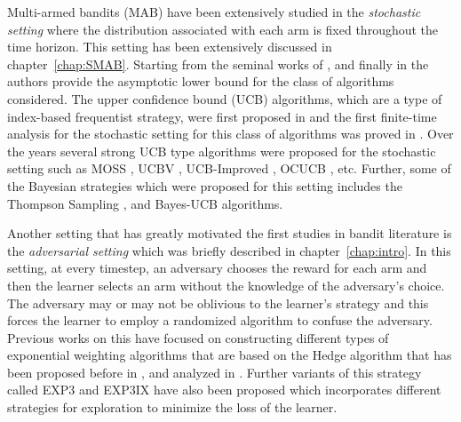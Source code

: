 Multi-armed bandits (MAB) have been extensively studied in the \textit{stochastic setting} where the distribution associated with each arm is fixed throughout the time horizon. This setting has been extensively discussed in chapter~\ref{chap:SMAB}. Starting from the seminal works of \citet{thompson1933likelihood}, \citet{robbins1952some} and finally in \citet{lai1985asymptotically} the authors provide the asymptotic lower bound for the class of algorithms considered.  The upper confidence bound (UCB) algorithms, which are a type of index-based frequentist strategy, were first proposed in \citet{agrawal1995sample} and the first finite-time analysis for the stochastic setting for this class of algorithms was proved in \citet{auer2002finite}. Over the years several strong UCB type algorithms were proposed for the stochastic setting such as MOSS \citep{audibert2009minimax}, UCBV \citep{audibert2009exploration}, UCB-Improved \citep{auer2010ucb}, OCUCB \citep{lattimore2015optimally}, etc. Further, some of the Bayesian strategies which were proposed for this setting includes the Thompson Sampling \citep{agrawal2012analysis},\citep{agrawal2013further} and Bayes-UCB \citep{kaufmann2012bayesian} algorithms.

Another setting that has greatly motivated the first studies in bandit literature is the \textit{adversarial setting} which was briefly described in chapter~\ref{chap:intro}. In this setting, at every timestep, an adversary chooses the reward for each arm and then the learner selects an arm without the knowledge of the adversary's choice. The adversary may or may not be oblivious to the learner's strategy and this forces the learner to employ a randomized algorithm to confuse the adversary. Previous works on this have focused on constructing different types of exponential weighting algorithms that are based on the Hedge algorithm that has been proposed before in \citet{littlestone1994weighted},\citet{freund1995desicion} and analyzed in \citet{auer1995gambling}. Further variants of this strategy called EXP3 \citep{auer2002nonstochastic} and EXP3IX \citep{kocak2014efficient} have also been proposed which incorporates different strategies for exploration to minimize the loss of the learner.

